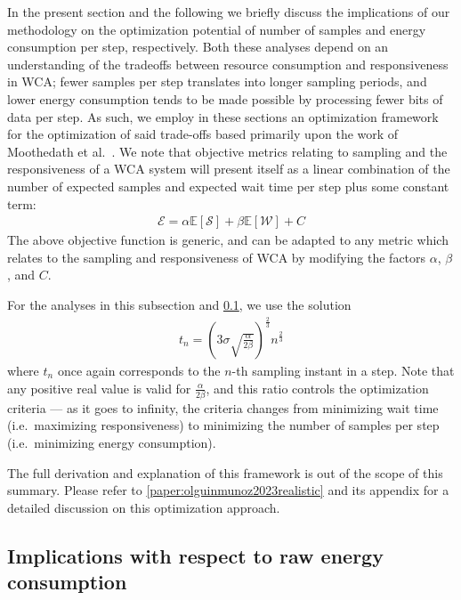 In the present section and the following we briefly discuss the implications of our methodology on the optimization potential of number of samples and energy consumption per step, respectively.
Both these analyses depend on an understanding of the tradeoffs between resource consumption and responsiveness in \gls{WCA};
fewer samples per step translates into longer sampling periods, and lower energy consumption tends to be made possible by processing fewer bits of data per step.
As such, we employ in these sections an optimization framework for the optimization of said trade-offs based primarily upon the work of Moothedath et al.~\cite{moothedath2021energy,moothedath2022energy1,moothedath2022energy2}.
We note that objective metrics relating to sampling and the responsiveness of a \gls{WCA} system will present itself as a linear combination of the number of expected samples and expected wait time per step plus some constant term:
\begin{align}
    \mathcal{E} = \alpha\mathbb{E}[\mathcal{S}] + \beta\mathbb{E}[\mathcal{W}] + C\label{eq:genericopt}
\end{align}
The above objective function is generic, and can be adapted to any metric which relates to the sampling and responsiveness of \gls{WCA} by modifying the factors \ensuremath{\alpha}, \ensuremath{\beta}, and \ensuremath{C}.

For the analyses in this subsection and \cref{ssec:implications:energy}, we use the solution
\begin{align}
    t_n = \left( 3\sigma\sqrt {\frac{\alpha}{2\beta}} \right)^{\frac{2}{3}} n^{\frac{2}{3}}
\end{align}
where \ensuremath{t_n} once again corresponds to the \ensuremath{n}-th sampling instant in a step.
Note that any positive real value is valid for \ensuremath{\frac{\alpha}{2\beta}}, and this ratio controls the optimization criteria --- as it goes to infinity, the criteria changes from minimizing wait time (i.e.\ maximizing responsiveness) to minimizing the number of samples per step (i.e.\ minimizing energy consumption).

The full derivation and explanation of this framework is out of the scope of this summary.
Please refer to \cref{paper:olguinmunoz2023realistic} and its appendix for a detailed discussion on this optimization approach.



\subsection{Implications with respect to raw energy consumption}\label{ssec:implications:energy}
